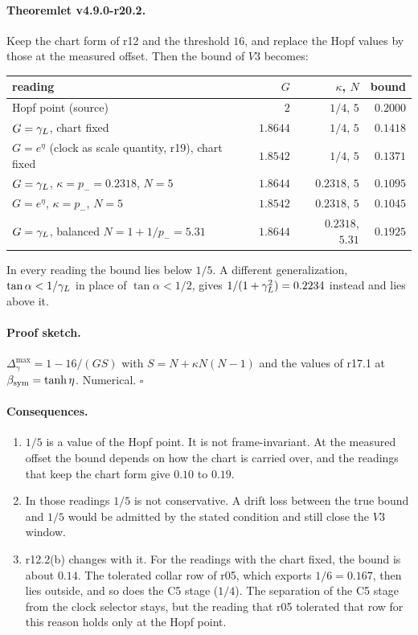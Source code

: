 \paragraph{Theoremlet v4.9.0-r20.2.}
Keep the chart form of r12 and the threshold \(16\), and replace the Hopf values by those at the measured offset.  Then the bound
of \(V3\) becomes:
\begin{center}
\small
\begin{tabular}{@{}>{\raggedright\arraybackslash}p{}rrr@{}}
\toprule
reading & \(G\) & \(\kappa\), \(N\) & bound\\
\midrule
Hopf point (source) & \(2\) & \(1/4\), \(5\) & \(0.2000\)\\
\(G=\gamma_L\), chart fixed & \(1.8644\) & \(1/4\), \(5\) & \(0.1418\)\\
\(G=e^\eta\) (clock as scale quantity, r19), chart fixed & \(1.8542\) & \(1/4\), \(5\) & \(0.1371\)\\
\(G=\gamma_L\), \(\kappa=p_-=0.2318\), \(N=5\) & \(1.8644\) & \(0.2318\), \(5\) & \(0.1095\)\\
\(G=e^\eta\), \(\kappa=p_-\), \(N=5\) & \(1.8542\) & \(0.2318\), \(5\) & \(0.1045\)\\
\(G=\gamma_L\), balanced \(N=1+1/p_-=5.31\) & \(1.8644\) & \(0.2318\), \(5.31\) & \(0.1925\)\\
\bottomrule
\end{tabular}
\end{center}
In every reading the bound lies below \(1/5\).  A different generalization, \(\tan\alpha<1/\gamma_L\) in place of \(\tan\alpha<1/2\),
gives \(1/(1+\gamma_L^2)=0.2234\) instead and lies above it.

\paragraph{Proof sketch.}
\(\Delta_\gamma^{\max}=1-16/(GS)\) with \(S=N+\kappa N(N-1)\) and the values of r17.1 at \(\beta_{\mathrm{sym}}=\tanh\eta\).  Numerical.  \(\square\)

\paragraph{Consequences.}
\begin{enumerate}[leftmargin=2em]
\item \(1/5\) is a value of the Hopf point.  It is not frame-invariant.  At the measured offset the bound depends on how the
chart is carried over, and the readings that keep the chart form give \(0.10\) to \(0.19\).
\item In those readings \(1/5\) is not conservative.  A drift loss between the true bound and \(1/5\) would be admitted by the
stated condition and still close the \(V3\) window.
\item r12.2(b) changes with it.  For the readings with the chart fixed, the bound is about \(0.14\).  The tolerated collar row
of r05, which exports \(1/6=0.167\), then lies outside, and so does the C5 stage (\(1/4\)).  The separation of the C5 stage from
the clock selector stays, but the reading that r05 tolerated that row for this reason holds only at the Hopf point.
\end{enumerate}

